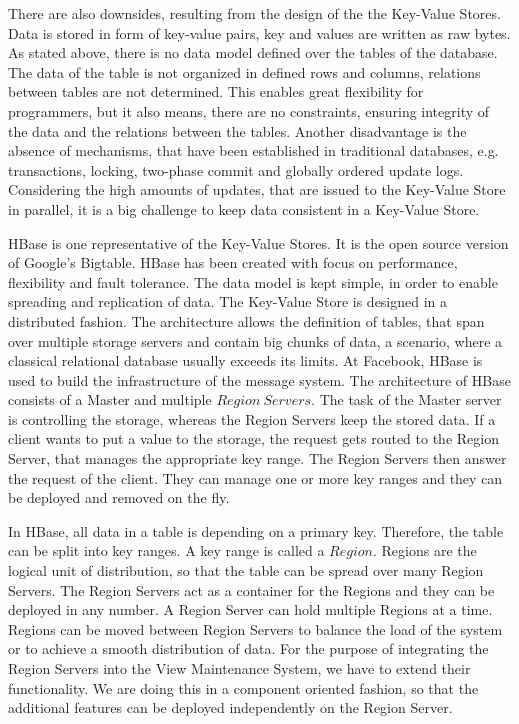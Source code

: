 \documentclass[11pt,a4paper,bibtotoc,idxtotoc,headsepline,footsepline,footexclude,BCOR12mm,DIV13]{scrbook}
\begin{document}
There are also downsides, resulting from the design of the the Key-Value Stores. Data is stored in form of key-value pairs, key and values are written as raw bytes. As stated above, there is no data model defined over the tables of the database. The data of the table is not organized in defined rows and columns, relations between tables are not determined. This enables great flexibility for programmers, but it also means, there are no constraints, ensuring integrity of the data and the relations between the tables. Another disadvantage is the absence of mechanisms, that have been established in traditional databases, e.g. transactions, locking, two-phase commit and globally ordered update logs\cite{jacobsen:viewmaintenance}. Considering the high amounts of updates, that are issued to the Key-Value Store in parallel, it is a big challenge to keep data consistent in a Key-Value Store.

HBase\cite{george:HBase} is one representative of the Key-Value Stores. It is the open source version of Google's Bigtable\cite{chang:bigtable}. HBase has been created with focus on performance, flexibility and fault tolerance. The data model is kept simple, in order to enable spreading and replication of data. The Key-Value Store is designed in a distributed fashion. The architecture allows the definition of tables, that span over multiple storage servers and contain big chunks of data, a scenario, where a classical relational database usually exceeds its limits. At Facebook, HBase is used to build the infrastructure of the message system\cite{borthakur:facebook}. The architecture of HBase consists of a Master and multiple $Region\:Servers$. The task of the Master server is controlling the storage, whereas the Region Servers keep the stored data. If a client wants to put a value to the storage, the request gets routed to the Region Server, that manages the appropriate key range. The Region Servers then answer the request of the client. They can manage one or more key ranges and they can be deployed and removed on the fly. 

In HBase, all data in a table is depending on a primary key. Therefore, the table can be split into key ranges. A key range is called a $Region$. Regions are the logical unit of distribution, so that the table can be spread over many Region Servers. The Region Servers act as a container for the Regions and they can be deployed in any number. A Region Server can hold multiple Regions at a time. Regions can be moved between Region Servers to balance the load of the system or to achieve a smooth distribution of data.  For the purpose of integrating the Region Servers into the View Maintenance System, we have to extend their functionality. We are doing this in a component oriented fashion, so that the additional features can be deployed independently on the Region Server.
\end{document}

